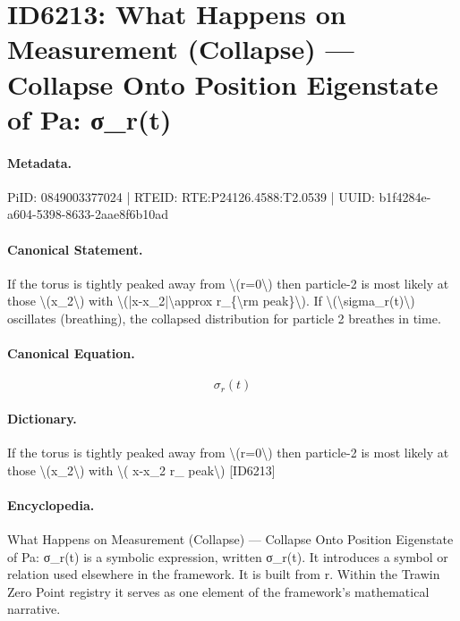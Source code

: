 \section*{ID6213: What Happens on Measurement (Collapse) — Collapse Onto Position Eigenstate of Pa: σ\_r(t)}
\paragraph{Metadata.}
PiID: 0849003377024 | RTEID: RTE:P24126.4588:T2.0539 | UUID: b1f4284e-a604-5398-8633-2aae8f6b10ad

\paragraph{Canonical Statement.}
If the torus is tightly peaked away from \textbackslash{}(r=0\textbackslash{}) then particle-2 is most likely at those \textbackslash{}(x\_2\textbackslash{}) with \textbackslash{}(|x-x\_2|\textbackslash{}approx r\_\{\textbackslash{}rm peak\}\textbackslash{}). If \textbackslash{}(\textbackslash{}sigma\_r(t)\textbackslash{}) oscillates (breathing), the collapsed distribution for particle 2 breathes in time.

\paragraph{Canonical Equation.}
\[
\sigma_r(t)
\]

\paragraph{Dictionary.}
If the torus is tightly peaked away from \textbackslash{}(r=0\textbackslash{}) then particle-2 is most likely at those \textbackslash{}(x\_2\textbackslash{}) with \textbackslash{}( x-x\_2 r\_ peak\textbackslash{}) [ID6213]

\paragraph{Encyclopedia.}
What Happens on Measurement (Collapse) — Collapse Onto Position Eigenstate of Pa: σ\_r(t) is a symbolic expression, written σ\_r(t). It introduces a symbol or relation used elsewhere in the framework. It is built from r. Within the Trawin Zero Point registry it serves as one element of the framework's mathematical narrative.
